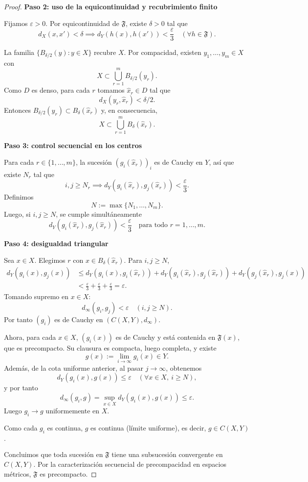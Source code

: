 \begin{proof}
\textbf{Paso 2: uso de la equicontinuidad y recubrimiento finito}

Fijamos $\varepsilon>0$. Por equicontinuidad de $\mathfrak{F}$, existe $\delta>0$ tal que
\[
d_X(x,x')<\delta \implies d_Y(h(x),h(x'))<\frac{\varepsilon}{3}
\quad(\forall h\in\mathfrak{F}).
\]

La familia $\{B_{\delta/2}(y):y\in X\}$ recubre $X$. Por compacidad, existen
$y_1,\dots,y_m\in X$ con
\[
X\subset\bigcup_{r=1}^m B_{\delta/2}(y_r).
\]
Como $D$ es denso, para cada $r$ tomamos $\hat x_r\in D$ tal que
\[
d_X(y_r,\hat x_r)<\delta/2.
\]
Entonces $B_{\delta/2}(y_r)\subset B_\delta(\hat x_r)$ y, en consecuencia,
\[
X\subset\bigcup_{r=1}^m B_\delta(\hat x_r).
\]

\textbf{Paso 3: control secuencial en los centros}

Para cada $r\in\{1,\dots,m\}$, la sucesión $(g_i(\hat x_r))_i$ es de Cauchy en $Y$,
así que existe $N_r$ tal que
\[
i,j\ge N_r \implies d_Y(g_i(\hat x_r),g_j(\hat x_r))<\frac{\varepsilon}{3}.
\]
Definimos
\[
N:=\max\{N_1,\dots,N_m\}.
\]
Luego, si $i,j\ge N$, se cumple simultáneamente
\[
d_Y(g_i(\hat x_r),g_j(\hat x_r))<\frac{\varepsilon}{3}
\quad \text{para todo } r=1,\dots,m.
\]

\textbf{Paso 4: desigualdad triangular}

Sea $x\in X$. Elegimos $r$ con $x\in B_\delta(\hat x_r)$. Para $i,j\ge N$,
\[
\begin{aligned}
d_Y(g_i(x),g_j(x))
&\le d_Y(g_i(x),g_i(\hat x_r))
+d_Y(g_i(\hat x_r),g_j(\hat x_r))
+d_Y(g_j(\hat x_r),g_j(x))\\
&<\frac{\varepsilon}{3}+\frac{\varepsilon}{3}+\frac{\varepsilon}{3}=\varepsilon.
\end{aligned}
\]
Tomando supremo en $x\in X$:
\[
d_\infty(g_i,g_j)<\varepsilon \quad (i,j\ge N).
\]
Por tanto $(g_i)$ es de Cauchy en $(C(X,Y),d_\infty)$.

Ahora, para cada $x\in X$, $(g_i(x))$ es de Cauchy y está contenida en
$\mathfrak{F}(x)$, que es precompacto. Su clausura es compacta, luego completa,
y existe
\[
g(x):=\lim_{i\to\infty}g_i(x)\in Y.
\]
Además, de la cota uniforme anterior, al pasar $j\to\infty$, obtenemos
\[
d_Y(g_i(x),g(x))\le\varepsilon \quad (\forall x\in X,\ i\ge N),
\]
y por tanto
\[
d_\infty(g_i,g)=\sup_{x\in X}d_Y(g_i(x),g(x))\le\varepsilon.
\]
Luego $g_i\to g$ uniformemente en $X$.

Como cada $g_i$ es continua, $g$ es continua (límite uniforme), es decir,
$g\in C(X,Y)$.

Concluimos que toda sucesión en $\mathfrak{F}$ tiene una subsucesión convergente en
$C(X,Y)$. Por la caracterización secuencial de precompacidad en espacios métricos,
$\mathfrak{F}$ es precompacto.
\end{proof}


